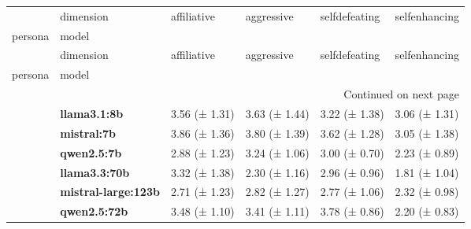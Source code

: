 \begin{longtable}{llllll}
\toprule
 & dimension & affiliative & aggressive & selfdefeating & selfenhancing \\
persona & model &  &  &  &  \\
\midrule
\endfirsthead
\toprule
 & dimension & affiliative & aggressive & selfdefeating & selfenhancing \\
persona & model &  &  &  &  \\
\midrule
\endhead
\midrule
\multicolumn{6}{r}{Continued on next page} \\
\midrule
\endfoot
\bottomrule
\endlastfoot
\multirow[t]{6}{*}{\textbf{base}} & \textbf{llama3.1:8b} & 3.56 (± 1.31) & 3.63 (± 1.44) & 3.22 (± 1.38) & 3.06 (± 1.31) \\
\textbf{} & \textbf{mistral:7b} & 3.86 (± 1.36) & 3.80 (± 1.39) & 3.62 (± 1.28) & 3.05 (± 1.38) \\
\textbf{} & \textbf{qwen2.5:7b} & 2.88 (± 1.23) & 3.24 (± 1.06) & 3.00 (± 0.70) & 2.23 (± 0.89) \\
\textbf{} & \textbf{llama3.3:70b} & 3.32 (± 1.38) & 2.30 (± 1.16) & 2.96 (± 0.96) & 1.81 (± 1.04) \\
\textbf{} & \textbf{mistral-large:123b} & 2.71 (± 1.23) & 2.82 (± 1.27) & 2.77 (± 1.06) & 2.32 (± 0.98) \\
\textbf{} & \textbf{qwen2.5:72b} & 3.48 (± 1.10) & 3.41 (± 1.11) & 3.78 (± 0.86) & 2.20 (± 0.83) \\
\cline{1-6}
\end{longtable}
